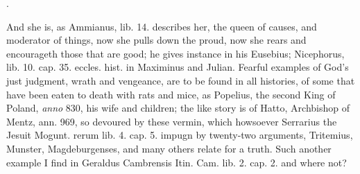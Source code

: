 {.

And she is, as Ammianus, lib. 14. describes her, the queen of
causes, and moderator of things, now she pulls down the proud, now she
rears and encourageth those that are good; he gives instance in his
Eusebius; Nicephorus, lib. 10. cap. 35. eccles. hist. in Maximinus and
Julian. Fearful examples of God's just judgment, wrath and vengeance,
are to be found in all histories, of some that have been eaten to death
with rats and mice, as Popelius, the second King of Poland, \emph{anno}
830, his wife and children; the like story is of Hatto, Archbishop of
Mentz, ann. 969, so devoured by these vermin, which howsoever Serrarius
the Jesuit Mogunt. rerum lib. 4. cap. 5. impugn by twenty-two
arguments, Tritemius, Munster, Magdeburgenses, and many others
relate for a truth. Such another example I find in Geraldus Cambrensis
Itin. Cam. lib. 2. cap. 2. and where not?

}
